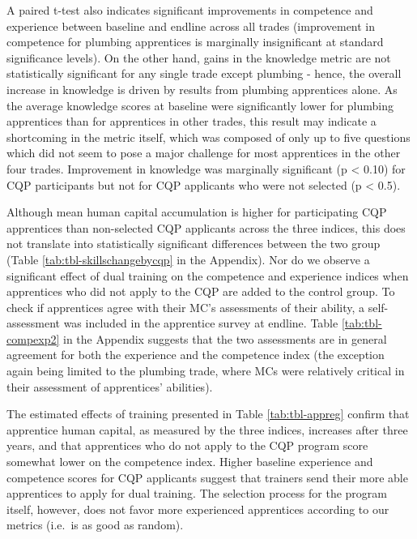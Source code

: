 \documentclass[
  a4paper, twoside, 12pt]{book}
\begin{document}
A paired t-test also indicates significant improvements in competence and experience between baseline and endline across all trades (improvement in competence for plumbing apprentices is marginally insignificant at standard significance levels). On the other hand, gains in the knowledge metric are not statistically significant for any single trade except plumbing - hence, the overall increase in knowledge is driven by results from plumbing apprentices alone. As the average knowledge scores at baseline were significantly lower for plumbing apprentices than for apprentices in other trades, this result may indicate a shortcoming in the metric itself, which was composed of only up to five questions which did not seem to pose a major challenge for most apprentices in the other four trades. Improvement in knowledge was marginally significant (p \textless{} 0.10) for CQP participants but not for CQP applicants who were not selected (p \textless{} 0.5).

Although mean human capital accumulation is higher for participating CQP apprentices than non-selected CQP applicants across the three indices, this does not translate into statistically significant differences between the two group (Table \ref{tab:tbl-skillschangebycqp} in the Appendix). Nor do we observe a significant effect of dual training on the competence and experience indices when apprentices who did not apply to the CQP are added to the control group. To check if apprentices agree with their MC's assessments of their ability, a self-assessment was included in the apprentice survey at endline. Table \ref{tab:tbl-compexp2} in the Appendix suggests that the two assessments are in general agreement for both the experience and the competence index (the exception again being limited to the plumbing trade, where MCs were relatively critical in their assessment of apprentices' abilities).

\begin{singlespacing}



\end{singlespacing}

The estimated effects of training presented in Table \ref{tab:tbl-appreg} confirm that apprentice human capital, as measured by the three indices, increases after three years, and that apprentices who do not apply to the CQP program score somewhat lower on the competence index. Higher baseline experience and competence scores for CQP applicants suggest that trainers send their more able apprentices to apply for dual training. The selection process for the program itself, however, does not favor more experienced apprentices according to our metrics (i.e.~is as good as random).
\end{document}

